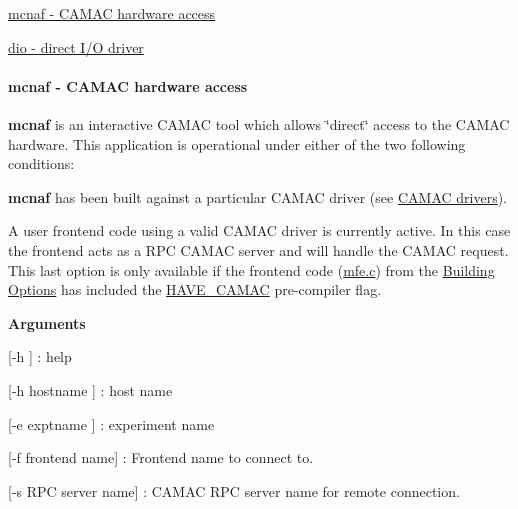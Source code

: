 \par



\begin{DoxyItemize}
\item \hyperlink{FE_utils_FE_mcnaf_utility}{mcnaf -\/ CAMAC hardware access}
\item \hyperlink{FE_utils_FE_dio_utility}{dio -\/ direct I/O driver}
\end{DoxyItemize}\hypertarget{FE_utils_FE_mcnaf_utility}{}\paragraph{mcnaf        -\/ CAMAC hardware access}\label{FE_utils_FE_mcnaf_utility}
{\bfseries mcnaf} is an interactive CAMAC tool which allows \char`\"{}direct\char`\"{} access to the CAMAC hardware. This application is operational under either of the two following conditions:
\begin{DoxyEnumerate}
\item {\bfseries mcnaf} has been built against a particular CAMAC driver (see \hyperlink{FE_Hardware_CAMAC_drivers}{CAMAC drivers}).
\item A user frontend code using a valid CAMAC driver is currently active. In this case the frontend acts as a RPC CAMAC server and will handle the CAMAC request. This last option is only available if the frontend code (\hyperlink{mfe_8c}{mfe.c}) from the \hyperlink{BuildingOptions_BO_building_option}{Building Options} has included the \hyperlink{BuildingOptions_BO_HAVE_CAMAC}{HAVE\_\-CAMAC} pre-\/compiler flag.
\end{DoxyEnumerate}


\begin{DoxyItemize}
\item {\bfseries  Arguments }
\begin{DoxyItemize}
\item \mbox{[}-\/h \mbox{]} : help
\item \mbox{[}-\/h hostname \mbox{]} : host name
\item \mbox{[}-\/e exptname \mbox{]} : experiment name
\item \mbox{[}-\/f frontend name\mbox{]} : Frontend name to connect to.
\item \mbox{[}-\/s RPC server name\mbox{]} : CAMAC RPC server name for remote connection.
\end{DoxyItemize}
\end{DoxyItemize}


